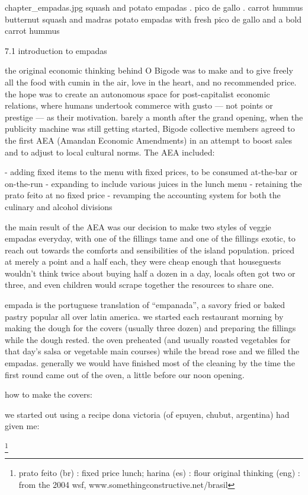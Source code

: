 \mychapter
{chapter_empadas.jpg}
{squash and potato empadas . pico de gallo . carrot hummus}
{butternut
squash and madras potato empadas with fresh pico de gallo and a bold
carrot hummus}

7.1  introduction to empadas

the original economic thinking behind O Bigode was to make and to give freely all the food with cumin in the air, love in the heart, and no recommended price. the hope was to create an autonomous space for post-capitalist economic relations, where humans undertook commerce with gusto --- not points or prestige --- as their motivation.
	barely a month after the grand opening, when the publicity machine was still getting started, Bigode collective members agreed to the first AEA (Amandan Economic Amendments) in an attempt to boost sales and to adjust to local cultural norms. The AEA included:

-	adding fixed items to the menu with fixed prices, to be consumed at-the-bar or on-the-run
-	expanding to include various juices in the lunch menu
-	retaining the prato feito at no fixed price
-	revamping the accounting system for both the culinary and alcohol divisions

the main result of the AEA was our decision to make two styles of veggie empadas everyday, with one of the fillings tame and one of the fillings exotic, to reach out towards the comforts and sensibilities of the island population. priced at merely a point and a half each, they were cheap enough that houseguests wouldn't think twice about buying half a dozen in a day, locals often got two or three, and even children would scrape together the resources to share one.

empada is the portuguese translation of ``empanada'', a savory fried or baked pastry popular all over latin america. we started each restaurant morning by making the dough for the covers (usually three dozen) and preparing the fillings while the dough rested. the oven preheated (and usually roasted vegetables for that day's salsa or vegetable main courses) while the bread rose and we filled the empadas. generally we would have finished most of the cleaning by the time the first round came out of the oven, a little before our noon opening.

	how to make the covers:

we started out using a recipe dona victoria (of epuyen, chubut, argentina) had given me:

\footnote{prato feito (br) : fixed price lunch;   harina (es) : flour
original thinking (eng) : from the 2004 wsf, www.somethingconstructive.net/brasil}

